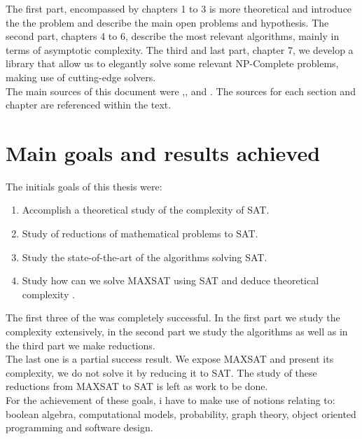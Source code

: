 The first part, encompassed by chapters 1 to 3 is more theoretical and introduce the  the problem and describe the main open problems and hypothesis.
The second part, chapters 4 to 6, describe the most relevant algorithms, mainly in terms of asymptotic complexity. The third and  last part, chapter 7, we develop a library that allow us to elegantly solve some relevant NP-Complete problems, making use of cutting-edge solvers.\\


The main sources of this document were \cite{schoning2013satisfiability},\cite{marek2009introduction},\cite{arora2009computational} and \cite{imms-sat18}. The sources for each section and chapter are referenced within the text.

\section*{Main goals and results achieved}
The initials goals of this thesis were:
\begin{enumerate}
\item Accomplish a theoretical study of the complexity of SAT.
\item Study of reductions of mathematical problems to SAT.
\item Study the state-of-the-art of the algorithms solving SAT.
\item Study how can we solve MAXSAT using SAT and deduce theoretical complexity .
\end{enumerate}

The first three of the was completely successful. In the first part we study the complexity extensively, in the second part we study the algorithms as well as in the third part we make reductions. \\

The last one is a partial success result. We expose MAXSAT and present its complexity, we do not solve it by reducing it to SAT. The study of these reductions from MAXSAT to SAT is left as work to be done.\\

For the achievement of these goals, i have to make use of notions relating to: boolean algebra, computational models, probability,  graph theory, object oriented programming and software design.



\endinput
